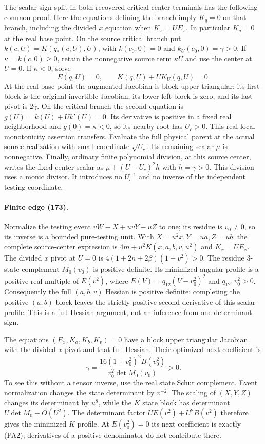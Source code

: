 The scalar sign split in both recovered critical-center terminals
has the following common proof.  Here the equations defining the
branch imply $K_q=0$ on that branch, including the divided $x$
equation when $K_x=U E_x$.  In particular $K_q=0$ at the real
base point.  On the source critical branch put
$k(c,U)=K(q_*(c,U),U)$, with $k(c_0,0)=0$ and
$k_U(c_0,0)=\gamma>0$.  If $\kappa=k(c,0)\geq0$, retain the
nonnegative source term $\kappa U$ and use the center at $U=0$.
If $\kappa<0$, solve
\[
 E(q,U)=0,\qquad K(q,U)+UK_U(q,U)=0.                 \tag{PA1}
\]
At the real base point the augmented Jacobian is block upper
triangular: its first block is the original invertible Jacobian,
its lower-left block is zero, and its last pivot is $2\gamma$.
On the critical branch the second equation is
$g(U)=k(U)+Uk'(U)=0$.  Its derivative is positive in a fixed real
neighborhood and $g(0)=\kappa<0$, so its nearby root has $U_c>0$.
This real local monotonicity assertion transfers.  Evaluate the full
physical parent at the actual source realization with small coordinate
$\sqrt{U_c}$.  Its remaining scalar $\mu$ is nonnegative.  Finally,
ordinary finite polynomial division, at this source center, writes the
fixed-center scalar as $\mu+(U-U_c)^2h$ with $\bar h=\gamma>0$.
This division uses a monic divisor.  It introduces no $U_c^{-1}$ and
no inverse of the independent testing coordinate.

\paragraph{Finite edge (173).}
Normalize the testing event $vW-X+uvY-uZ$ to one; its residue is
$v_0\ne0$, so its inverse is a bounded pure-testing unit.  With
$X=u^2x,Y=ua,Z=ub$, the complete source-center expression is
$4m+u^2K(x,a,b,v,u^2)$ and $K_x=U E_x$.
The divided $x$ pivot at $U=0$ is
$4(1+2n+2\beta)(1+v^2)>0$.
The residue $3$-state complement $M_0(v_0)$ is positive definite.
Its minimized angular profile is a positive real multiple of
$E(v^2)$, where
$E(V)=q_{12}(V-v_0^2)^2$ and $q_{12},v_0^2>0$.
Consequently the full $(a,b,v)$ Hessian is positive definite:
completing the positive $(a,b)$ block leaves the strictly positive
second derivative of this scalar profile.  This is a full Hessian
argument, not an inference from one determinant sign.

The equations $(E_x,K_a,K_b,K_v)=0$ have a block upper triangular
Jacobian with the divided $x$ pivot and that full Hessian.  Their
optimized next coefficient is
\[
 \gamma=\frac{16(1+v_0^2)^2 B(v_0^2)}
                 {v_0^2\det M_0(v_0)}>0.             \tag{PA2}
\]
To see this without a tensor inverse, use the real state Schur
complement.  Event normalization changes the state determinant by
$v^{-2}$.  The scaling of $(X,Y,Z)$ changes its determinant by
$u^8$, while the $K$ state block has determinant
$U\det M_0+O(U^2)$.  The determinant factor
$UE(v^2)+U^2B(v^2)$ therefore gives the minimized $K$ profile.
At $E(v_0^2)=0$ its next coefficient is exactly (PA2); derivatives
of a positive denominator do not contribute there.

